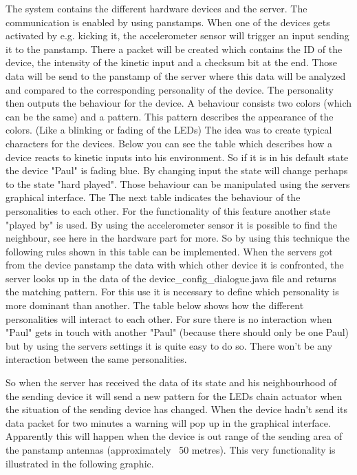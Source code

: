 The system contains the different hardware devices and the server. The communication is enabled by using panstamps. When one of the devices gets activated by e.g. kicking it, the accelerometer sensor will trigger an input sending it to the panstamp. There a packet will be created which contains the ID of the device, the intensity of the kinetic input and a checksum bit at the end.
Those data will be send to the panstamp of the server where this data will be analyzed and compared to the corresponding personality of the device. The personality then outputs the behaviour for the device. A behaviour consists two colors (which can be the same) and a pattern. This pattern describes the appearance of the colors. (Like a blinking or fading of the LEDs)
The idea was to create typical characters for the devices. Below you can see the table which describes how a device reacts to kinetic inputs into his environment. So if it is in his default state the device "Paul" is fading blue. By changing input the state will change perhaps to the state "hard played". Those behaviour can be manipulated using the servers graphical interface. The %
The next table indicates the behaviour of the personalities to each other. For the functionality of this feature another state "played by" is used. By using the accelerometer sensor it is possible to find the neighbour, see here in the hardware part for more.
So by using this technique the following rules shown in this table can be implemented.
When the servers got from the device panstamp the data with which other device it is confronted, the server looks up in the data of the device_config_dialogue.java file and returns the matching pattern. For this use it is necessary to define which personality is more dominant than another.
The table below shows how the different personalities will interact to each other.
For sure there is no interaction when "Paul" gets in touch with another "Paul" (because there should only be one Paul) but by using the servers settings it is quite easy to do so. There won't be any interaction between the same personalities.

So when the server has received the data of its state and his neighbourhood of the sending device it will send a new pattern for the LEDs chain actuator when the situation of the sending device has changed.
When the device hadn't send its data packet for two minutes a warning will pop up in the graphical interface. Apparently this will happen when the device is out range of the sending area of the panstamp antennas (approximately ~50 metres).
This very functionality is illustrated in the following graphic.
 
